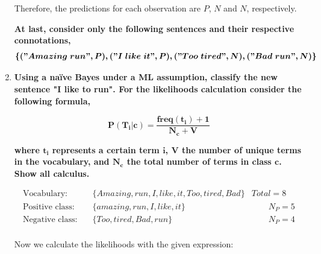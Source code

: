 \documentclass[12pt]{article}
\begin{document}
\begin{enumerate}[leftmargin=\labelsep]
    \vspace{10pt}
    Therefore, the predictions for each observation are $P$, $N$ and $N$, respectively.

    \vspace{10pt}

    \textbf{At last, consider only the following sentences and their respective connotations,}
    \[
    \boldsymbol{\{("Amazing\; run", P), ("I\; like\; it", P), ("Too\; tired", N), ("Bad\; run", N)\}}
    \]

    \item \textbf{Using a naïve Bayes under a ML assumption, classify the new sentence
    "I like to run". For the likelihoods calculation consider the following formula,}

    \begin{equation*}
        \boldsymbol{P(T_i|c) = \frac{freq(t_i) + 1}{N_c + V}}
    \end{equation*}

    \textbf{where $\mathbf{t_i}$ represents a certain term $\mathbf{i}$, $\mathbf{V}$ the number of unique terms in the vocabulary, and
    $\mathbf{N_c}$ the total number of terms in class $\mathbf{c}$. Show all calculus.}

    
    \vspace{10pt}
    \begin{equation*}
        \begin{aligned}
            \text{Vocabulary:} & \quad \{Amazing, run, I, like, it, Too, tired, Bad\} & Total = 8\\
            \text{Positive class:} & \quad \{amazing, run, I, like, it\} &\qquad N_P = 5\\
            \text{Negative class:} & \quad \{Too, tired, Bad, run\} &\qquad N_P = 4\\
        \end{aligned}
    \end{equation*}

    \vspace{10pt}
    Now we calculate the likelihoods with the given expression:


\end{enumerate}
\end{document}

